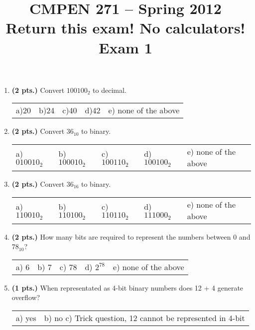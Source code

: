 \documentclass{article}
\begin{document}
\newcommand{\SOPmin}{${\rm SOP}_{\rm min} \ $}
\newcommand{\POSmin}{${\rm POS}_{\rm min} \ $}
\newcommand{\bs}{\backslash}


\title{
\Huge{CMPEN 271 -- Spring 2012}\\
\normalsize{Return this exam!  No calculators!}\\
\normalsize{Exam 1}\\
 }
\date{}

\maketitle{}


\begin{enumerate}

\item {\bf (2 pts.)} Convert $100100_2$ to decimal.

\begin{tabular}{p{0.7in} p{0.7in} p{0.7in} p{0.7in} l}
a)20 & b)24  & c)40  & d)42  & e) none of the above
\end{tabular}

\item {\bf (2 pts.)} Convert $36_{10}$ to binary.

\begin{tabular}{p{0.7in} p{0.7in} p{0.7in} p{0.7in} l}
a) $010010_2$ & b) $100010_2$ & c) $100110_2$ & d) $100100_2$ & e) none of the above
\end{tabular}

\item {\bf (2 pts.)} Convert $36_{16}$ to binary.

\begin{tabular}{p{0.7in} p{0.7in} p{0.7in} p{0.7in} l}
a) $110010_2$ & b) $110100_2$ & c) $110110_2$ & d) $111000_2$ & e) none of the above
\end{tabular}

\item {\bf (2 pts.)} How many bits are required to represent the numbers
between 0 and $78_{10}$?

\begin{tabular}{p{0.7in} p{0.7in} p{0.7in} p{0.7in} l}
a) 6 & b) 7 & c) 78 & d) $2^{78}$ & e) none of the above
\end{tabular}

\item {\bf (1 pts.)} When representated as 4-bit binary numbers does 12 + 4 
generate overflow?

\begin{tabular}{p{0.7in} l}
a) yes & b) no  c) Trick question, 12 cannot be represented in 4-bit
\end{tabular}


\end{enumerate}
\end{document}
